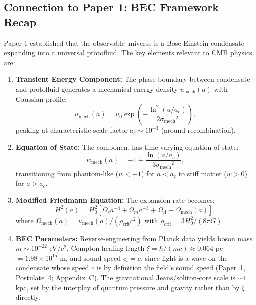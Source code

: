 \documentclass[11pt,a4paper]{article}
\newcommand{\rhocrit}{\ensuremath{\rho_{\mathrm{crit}}}}
\newcommand{\umech}{\ensuremath{u_{\mathrm{mech}}}}
\newcommand{\wmech}{\ensuremath{w_{\mathrm{mech}}}}
\newcommand{\ac}{\ensuremath{a_c}}
\newcommand{\sigmamech}{\ensuremath{\sigma_{\mathrm{mech}}}}
\newcommand{\Omm}{\ensuremath{\Omega_m}}
\newcommand{\Omr}{\ensuremath{\Omega_r}}
\newcommand{\OmL}{\ensuremath{\Omega_\Lambda}}
\theoremstyle{definition}
\theoremstyle{remark}
\begin{document}
\subsection{Connection to Paper 1: BEC Framework Recap}
\label{sec:framework_recap}

Paper 1 established that the observable universe is a Bose-Einstein condensate expanding into a universal protofluid. The key elements relevant to CMB physics are:

\begin{enumerate}[leftmargin=*, itemsep=0.3em]
\item \textbf{Transient Energy Component:} The phase boundary between condensate and protofluid generates a mechanical energy density $\umech(a)$ with Gaussian profile:
\begin{equation}
\label{eq:umech_profile}
\umech(a) = u_0 \exp\left( -\frac{\ln^2(a/\ac)}{2\sigmamech^2} \right),
\end{equation}
peaking at characteristic scale factor $\ac \sim 10^{-3}$ (around recombination).

\item \textbf{Equation of State:} The component has time-varying equation of state:
\begin{equation}
\label{eq:wmech}
\wmech(a) = -1 + \frac{\ln(a/\ac)}{3\sigmamech^2},
\end{equation}
transitioning from phantom-like ($w < -1$) for $a < \ac$ to stiff matter ($w > 0$) for $a > \ac$.

\item \textbf{Modified Friedmann Equation:} The expansion rate becomes:
\begin{equation}
\label{eq:friedmann_modified}
H^2(a) = H_0^2 \left[ \Omr a^{-4} + \Omm a^{-3} + \OmL + \Omega_{\mathrm{mech}}(a) \right],
\end{equation}
where $\Omega_{\mathrm{mech}}(a) = \umech(a)/(\rhocrit c^2)$ with $\rhocrit = 3H_0^2/(8\pi G)$.

\item \textbf{BEC Parameters:} Reverse-engineering from Planck data yields boson mass $m \sim 10^{-22}$ eV/$c^2$, Compton healing length $\xi = \hbar/(mc) \approx 0.064$ pc $= 1.98 \times 10^{15}$ m, and sound speed $c_s = c$, since light is a wave on the condensate whose speed $c$ is by definition the field's sound speed (Paper~1, Postulate~4; Appendix~C). The gravitational Jeans/soliton-core scale is $\sim 1$ kpc, set by the interplay of quantum pressure and gravity rather than by $\xi$ directly.
\end{enumerate}
\end{document}
